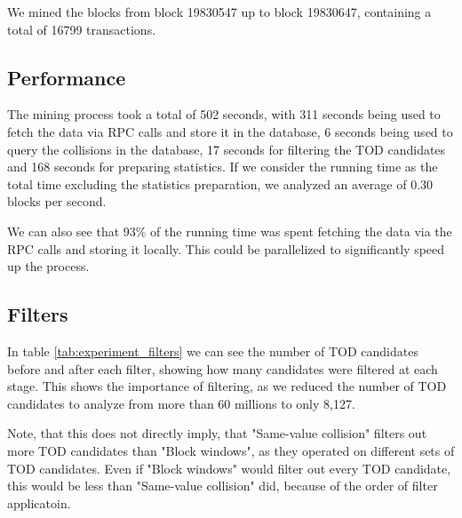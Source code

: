 \documentclass[draft,final]{vutinfth} %
\begin{document}
We mined the blocks from block 19830547 up to block 19830647, containing a total of 16799 transactions.

\subsection{Performance}

The mining process took a total of 502 seconds, with 311 seconds being used to fetch the data via RPC calls and store it in the database, 6 seconds being used to query the collisions in the database, 17 seconds for filtering the TOD candidates and 168 seconds for preparing statistics. If we consider the running time as the total time excluding the statistics preparation, we analyzed an average of 0.30 blocks per second.

We can also see that 93\% of the running time was spent fetching the data via the RPC calls and storing it locally. This could be parallelized to significantly speed up the process.

\subsection{Filters}

In table \ref{tab:experiment_filters} we can see the number of TOD candidates before and after each filter, showing how many candidates were filtered at each stage. This shows the importance of filtering, as we reduced the number of TOD candidates to analyze from more than 60 millions to only 8,127.

Note, that this does not directly imply, that "Same-value collision" filters out more TOD candidates than "Block windows", as they operated on different sets of TOD candidates. Even if "Block windows" would filter out every TOD candidate, this would be less than "Same-value collision" did, because of the order of filter applicatoin.
\end{document}
